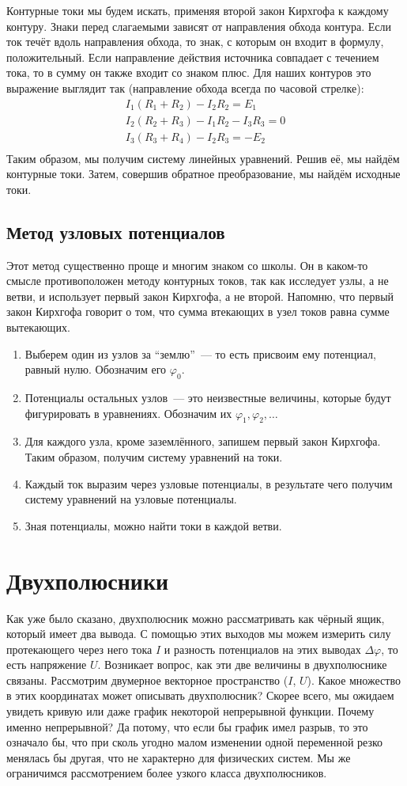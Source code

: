 \documentclass[11pt,a4paper]{article}
\begin{document}
Контурные токи мы будем искать, применяя второй закон Кирхгофа к каждому контуру.
Знаки перед слагаемыми зависят от направления обхода контура. Если ток течёт вдоль направления 
обхода, то знак, с которым он входит в формулу, положительный. Если направление действия источника 
совпадает с течением тока, то в сумму он также входит со знаком плюс.
Для наших контуров это выражение выглядит так (направление обхода всегда по часовой стрелке):
$$\begin{array}{l}
I_1 (R_1 + R_2) - I_2 R_2 = E_1 \\
I_2 (R_2 + R_3) - I_1 R_2 - I_3R_3 = 0 \\
I_3 (R_3 + R_4) - I_2 R_3 = - E_2 \\
\end{array}$$
Таким образом, мы получим систему линейных уравнений. Решив её, мы найдём контурные токи. Затем, 
совершив обратное преобразование, мы найдём исходные токи. 
\subsection{Метод узловых потенциалов}
Этот метод существенно проще и многим знаком со школы. Он в каком-то смысле противоположен методу 
контурных токов, так как исследует узлы, а не ветви, и использует первый закон Кирхгофа, а не второй. 
Напомню, что первый закон Кирхгофа говорит о том, что сумма втекающих в узел токов равна сумме вытекающих.
\begin{enumerate}
    \item Выберем один из узлов за ``землю''~--- то есть присвоим ему потенциал, равный нулю. Обозначим его $\varphi_0$.
    \item Потенциалы остальных узлов~--- это неизвестные величины, которые будут фигурировать в уравнениях. Обозначим их $\varphi_1, \varphi_2, \dots$
    \item Для каждого узла, кроме заземлённого, запишем первый закон Кирхгофа. Таким образом, получим систему уравнений на токи.
    \item Каждый ток выразим через узловые потенциалы, в результате чего получим систему уравнений на узловые потенциалы.
    \item Зная потенциалы, можно найти токи в каждой ветви.
\end{enumerate}

\section{Двухполюсники}
Как уже было сказано, двухполюсник можно рассматривать как чёрный ящик, который имеет два вывода. 
С помощью этих выходов мы можем измерить силу протекающего через него тока $I$ и разность потенциалов 
на этих выводах $\Delta\varphi$, то есть напряжение $U$. Возникает вопрос, как эти две величины в двухполюснике связаны.
Рассмотрим двумерное векторное пространство ($I$, $U$). Какое множество в этих координатах может описывать 
двухполюсник? Скорее всего, мы ожидаем увидеть кривую или даже график некоторой непрерывной функции. Почему 
именно непрерывной? Да потому, что если бы график имел разрыв, то это означало бы, что при сколь угодно 
малом изменении одной переменной резко менялась бы другая, что не характерно для физических систем. 
Мы же ограничимся рассмотрением более узкого класса двухполюсников.
\end{document}
